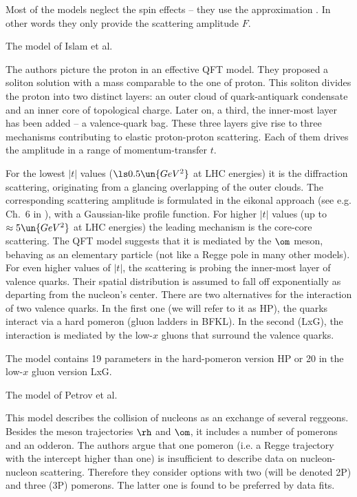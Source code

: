 Most of the models neglect the spin effects -- they use the approximation . In other words they only provide the scattering amplitude $F$.

\caption{The model of Islam et al. }

The authors picture the proton in an effective QFT model. They proposed a soliton solution with a mass comparable to the one of proton. This soliton divides the proton into two distinct layers: an outer cloud of quark-antiquark condensate and an inner core of topological charge. Later on, a third, the inner-most layer has been added -- a valence-quark bag. These three layers give rise to three mechanisms contributing to elastic proton-proton scattering. Each of them drives the amplitude in a range of momentum-transfer $t$.

For the lowest $|t|$ values ($\ls 0.5\un{GeV^2}$ at LHC energies) it is the diffraction scattering, originating from a glancing overlapping of the outer clouds. The corresponding scattering amplitude is formulated in the eikonal approach (see e.g. Ch.~6 in ), with a Gaussian-like profile function. For higher $|t|$ values (up to $\approx 5\un{GeV^2}$ at LHC energies) the leading mechanism is the core-core scattering. The QFT model suggests that it is mediated by the $\rm\om$ meson, behaving as an elementary particle (not like a Regge pole in many other models). For even higher values of $|t|$, the scattering is probing the inner-most layer of valence quarks. Their spatial distribution is assumed to fall off exponentially as departing from the nucleon's center. There are two alternatives for the interaction of two valence quarks. In the first one (we will refer to it as HP), the quarks interact via a hard pomeron (gluon ladders in BFKL). In the second (LxG), the interaction is mediated by the low-$x$ gluons that surround the valence quarks.

The model contains 19 parameters in the hard-pomeron version HP or 20 in the low-$x$ gluon version LxG.

\caption{The model of Petrov et al. }

This model describes the collision of nucleons as an exchange of several reggeons. Besides the meson trajectories $\rm\rh$ and $\rm\om$, it includes a number of pomerons and an odderon. The authors argue that one pomeron (i.e. a Regge trajectory with the intercept higher than one) is insufficient to describe data on nucleon-nucleon scattering. Therefore they consider options with two (will be denoted 2P) and three (3P) pomerons. The latter one is found to be preferred by data fits.

